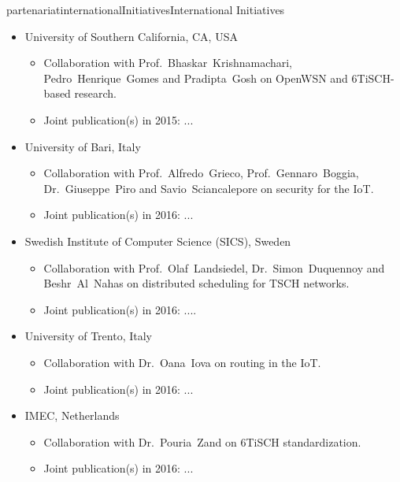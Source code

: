 \documentclass{ra2016}
\begin{document}
\begin{module}{partenariat}{internationalInitiatives}{International Initiatives}
\begin{itemize}
    \item University of Southern California, CA, USA
        \begin{itemize}
            \item Collaboration with Prof.~Bhaskar~Krishnamachari, Pedro~Henrique~Gomes and Pradipta~Gosh on OpenWSN and 6TiSCH-based research.
            \item Joint publication(s) in 2015: ...
        \end{itemize}
    \item University of Bari, Italy
        \begin{itemize}
            \item Collaboration with Prof.~Alfredo~Grieco, Prof.~Gennaro~Boggia, Dr.~Giuseppe~Piro and Savio~Sciancalepore on security for the IoT.
            \item Joint publication(s) in 2016: ...
        \end{itemize}
    \item Swedish Institute of Computer Science (SICS), Sweden
        \begin{itemize}
            \item Collaboration with Prof.~Olaf~Landsiedel, Dr.~Simon~Duquennoy and Beshr~Al~Nahas on distributed scheduling for TSCH networks.
            \item Joint publication(s) in 2016: ....
        \end{itemize}
    \item University of Trento, Italy
        \begin{itemize}
            \item Collaboration with Dr.~Oana~Iova on routing in the IoT.
            \item Joint publication(s) in 2016: ...
        \end{itemize}
    \item IMEC, Netherlands
        \begin{itemize}
            \item Collaboration with Dr.~Pouria~Zand on 6TiSCH standardization.
            \item Joint publication(s) in 2016: ...
        \end{itemize}
\end{itemize}




\end{module}
\end{document}
